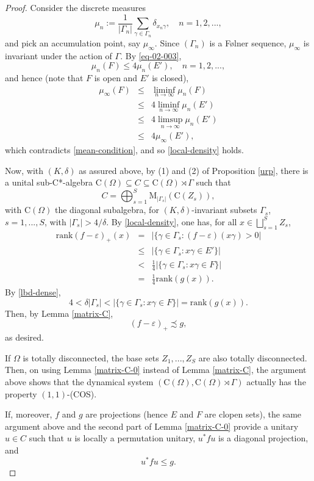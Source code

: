 \documentclass[12pt, oneside, psamsfonts]{amsart}
\theoremstyle{definition}
\theoremstyle{remark}
\numberwithin{equation}{section}
\newcommand{\abs}[1]{\left\vert#1\right\vert}
\newcommand{\eps}{\varepsilon}
\begin{document}
\begin{proof}
Consider the discrete measures
$$
\mu_n:=\frac{1}{\abs{\Gamma_{n}}} \sum_{\gamma \in \Gamma_{n}} \delta_{x_n \gamma},\quad n=1, 2, ...,
$$
and pick an accumulation point, say $\mu_\infty$. Since $(\Gamma_n)$ is a F{\o}lner sequence, $\mu_\infty$ is invariant under the action of $\Gamma$.  
By \eqref{eq-02-003},
$$\mu_n(F) \leq 4 \mu_n(E'),\quad n=1, 2, ...,$$
and hence (note that $F$ is open and $E'$ is closed), 
\begin{eqnarray*}
\mu_\infty(F) & \leq & \liminf_{n \to \infty} \mu_n(F) \\
& \leq & 4 \liminf_{n \to \infty} \mu_n(E') \\
& \leq & 4 \limsup_{n \to \infty} \mu_n(E') \\
& \leq & 4 \mu_\infty(E'),
\end{eqnarray*}
which contradicts \eqref{mean-condition}, and so \eqref{local-density}  holds. 

Now, with $(K, \delta)$ as assured above, by (1) and (2) of Proposition \ref{urp}, there is a unital sub-C*-algebra $\mathrm{C}(\Omega) \subseteq C \subseteq \mathrm{C}(\Omega) \rtimes \Gamma$ such that
$$C = \bigoplus_{s = 1}^S \mathrm{M}_{\abs{\Gamma_s}}(\mathrm{C}(Z_s)),$$
with $\mathrm{C}(\Omega)$ the diagonal  subalgebra, for $(K, \delta)$-invariant subsets $\Gamma_s$, $s=1, ..., S$, with $\abs{\Gamma_s} > 4/\delta$. 
By \eqref{local-density}, one has, for all $x \in \bigsqcup_{s = 1}^S Z_s$, 
\begin{eqnarray*}
\mathrm{rank}(f - \eps)_+(x) & = &\abs{\{\gamma \in \Gamma_s: (f - \eps)(x\gamma) > 0 } \\
& \leq &\abs{\{\gamma \in \Gamma_s: x\gamma \in E'  \} } \\
& < & \frac{1}{4}\abs{\{\gamma \in \Gamma_s: x\gamma \in F  \} } \\
& = & \frac{1}{4} \mathrm{rank}(g(x)).
\end{eqnarray*}  
By \eqref{lbd-dense}, 
$$ 4 <  \delta \abs{\Gamma_s} <  \abs{\{\gamma \in \Gamma_s: x\gamma \in F  \} } = \mathrm{rank}(g(x)). $$
Then, by Lemma \ref{matrix-C}, 
$$ (f - \eps)_+ \precsim g,$$
as desired.

If $\Omega$ is totally disconnected, the base sets $Z_1, ..., Z_S$ are also totally disconnected. Then, on using Lemma \ref{matrix-C-0} instead of Lemma \ref{matrix-C}, the argument above shows that the dynamical system $(\mathrm{C}(\Omega), \mathrm{C}(\Omega) \rtimes \Gamma)$ actually has the property $(1, 1)$-(COS).

If, moreover, $f$ and $g$ are projections (hence $E$ and $F$ are clopen sets), the same argument above and the second part of Lemma \ref{matrix-C-0} provide a unitary $u \in C$ such that $u$ is locally a permutation unitary, $u^*fu$ is a diagonal projection, and $$u^*fu \leq g.$$ 


\end{proof}
\end{document}
